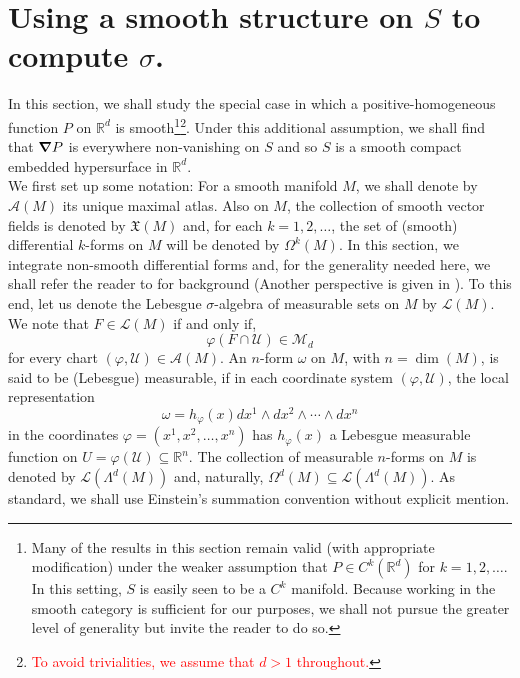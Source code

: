 \documentclass[11pt]{article}
\theoremstyle{remark}
\begin{document}
\section{Using a smooth structure on $S$ to compute $\sigma$.}\label{sec:SigmaForSmoothP}

\noindent In this section, we shall study the special case in which a positive-homogeneous function $P$ on $\mathbb{R}^d$ is smooth\footnote{Many of the results in this section remain valid (with appropriate modification) under the weaker assumption that $P\in C^k(\mathbb{R}^d)$ for $k=1,2,\dots$. In this setting, $S$ is easily seen to be a $C^k$ manifold. Because working in the smooth category is sufficient for our purposes, we shall not pursue the greater level of generality but invite the reader to do so.}\footnote{\textcolor{red}{To avoid trivialities, we assume that $d>1$ throughout.}}.
Under this additional assumption, we shall find that $\grad P$ is everywhere non-vanishing on $S$ and so $S$ is a smooth compact embedded hypersurface in $\mathbb{R}^d$.\\

\noindent We first set up some notation: For a smooth manifold $M$, we shall denote by $\mathcal{A}(M)$ its unique maximal atlas. Also on $M$, the collection of smooth vector fields is denoted by $\mathfrak{X}(M)$ and, for each $k=1,2,\dots$, the set of (smooth) differential $k$-forms on $M$ will be denoted by $\Omega^k(M)$.  In this section, we integrate non-smooth differential forms and, for the generality needed here, we shall refer the reader to \cite{Naber2011} for background (Another perspective is given in \cite{Amann2009}). To this end, let us denote the Lebesgue $\sigma$-algebra of measurable sets on $M$ by $\mathcal{L}(M)$. We note that $F\in\mathcal{L}(M)$ if and only if, \begin{equation*}
    \varphi(F\cap \mathcal{U})\in\mathcal{M}_d
\end{equation*}
for every chart $(\varphi,\mathcal{U})\in\mathcal{A}(M)$. An $n$-form $\omega$ on $M$, with $n=\dim(M)$, is said to be (Lebesgue) measurable, if in each coordinate system $(\varphi,\mathcal{U})$, the local representation
\begin{equation*}
    \omega=h_{\varphi}(x)dx^1\wedge dx^2\wedge \cdots\wedge dx^n
\end{equation*}
in the coordinates $\varphi=(x^1,x^2,\dots,x^n)$ has $h_{\varphi}(x)$ a Lebesgue measurable function on $U=\varphi(\mathcal{U})\subseteq\mathbb{R}^n$. The collection of measurable $n$-forms on $M$ is denoted by $\mathcal{L}(\Lambda^d(M))$ and, naturally, $\Omega^{d}(M)\subseteq \mathcal{L}(\Lambda^d(M))$. As standard, we shall use Einstein's summation convention without explicit mention.\\
\end{document}
